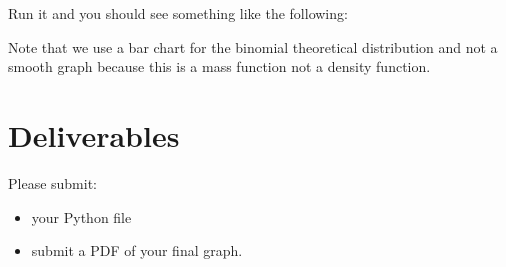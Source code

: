 \begin{fullwidth}
\step Run it and you should see something like the following:


Note that we use a bar chart for the binomial theoretical distribution and not a smooth graph because this is a mass function not a density function.

\section{Deliverables}

Please submit:

\begin{itemize}
\item your Python file
\item submit a PDF of your final graph.
\end{itemize}

\end{fullwidth}
